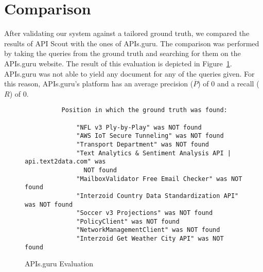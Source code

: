 \section{Comparison}\label{sec:comparison}
After validating our system against a tailored ground truth, we compared the results of API Scout with the ones of APIs.guru.
The comparison was performed by taking the queries from the ground truth and searching for them on the APIs.guru website.
The result of this evaluation is depicted in Figure~\ref{fig:apis-guru-eval}.
APIs.guru was not able to yield any document for any of the queries given.
For this reason, APIs.guru's platform has an average precision ($\overline{P}$) of 0 and a recall ($R$) of 0.

\begin{figure}[!h]
    \begin{verbatim}
          Position in which the ground truth was found:

              "NFL v3 Ply-by-Play" was NOT found
              "AWS IoT Secure Tunneling" was NOT found
              "Transport Department" was NOT found
              "Text Analytics & Sentiment Analysis API | api.text2data.com" was
                NOT found
              "MailboxValidator Free Email Checker" was NOT found
              "Interzoid Country Data Standardization API" was NOT found
              "Soccer v3 Projections" was NOT found
              "PolicyClient" was NOT found
              "NetworkManagementClient" was NOT found
              "Interzoid Get Weather City API" was NOT found
    \end{verbatim}
    \caption{APIs.guru Evaluation}
    \label{fig:apis-guru-eval}
\end{figure}
